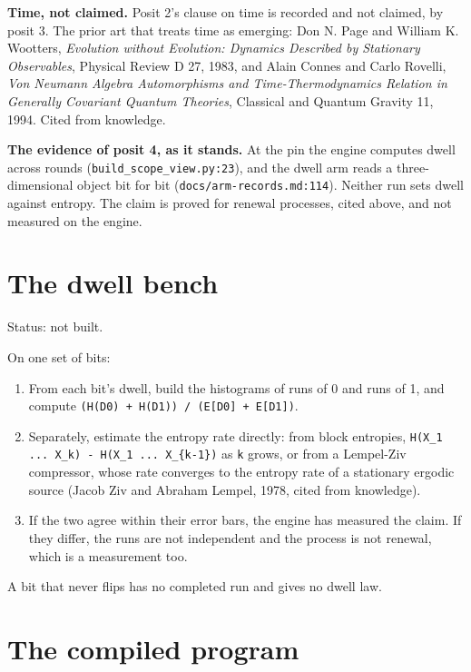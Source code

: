 \textbf{Time, not claimed.} Posit 2's clause on time is recorded and not claimed, by posit 3. The prior art that treats time as emerging: Don N. Page and William K. Wootters, \emph{Evolution without Evolution: Dynamics Described by Stationary Observables}, Physical Review D 27, 1983, and Alain Connes and Carlo Rovelli, \emph{Von Neumann Algebra Automorphisms and Time-Thermodynamics Relation in Generally Covariant Quantum Theories}, Classical and Quantum Gravity 11, 1994. Cited from knowledge.

\textbf{The evidence of posit 4, as it stands.} At the pin the engine computes dwell across rounds (\texttt{build\_\allowbreak{}scope\_\allowbreak{}view.\allowbreak{}py:23}), and the dwell arm reads a three-dimensional object bit for bit (\texttt{docs/\allowbreak{}arm-\allowbreak{}records.\allowbreak{}md:114}). Neither run sets dwell against entropy. The claim is proved for renewal processes, cited above, and not measured on the engine.

\section{\texorpdfstring{The dwell bench}{The dwell bench}}

Status: not built.

On one set of bits:

\begin{enumerate}
\item From each bit's dwell, build the histograms of runs of 0 and runs of 1, and compute \texttt{(H(D0) + H(D1)) /\allowbreak{} (E[D0] + E[D1])}.
\item Separately, estimate the entropy rate directly: from block entropies, \texttt{H(X\_\allowbreak{}1 .\allowbreak{}.\allowbreak{}.\allowbreak{} X\_\allowbreak{}k) -\allowbreak{} H(X\_\allowbreak{}1 .\allowbreak{}.\allowbreak{}.\allowbreak{} X\_\allowbreak{}\{k-\allowbreak{}1\})} as \texttt{k} grows, or from a Lempel-Ziv compressor, whose rate converges to the entropy rate of a stationary ergodic source (Jacob Ziv and Abraham Lempel, 1978, cited from knowledge).
\item If the two agree within their error bars, the engine has measured the claim. If they differ, the runs are not independent and the process is not renewal, which is a measurement too.
\end{enumerate}

A bit that never flips has no completed run and gives no dwell law.

\section{\texorpdfstring{The compiled program}{The compiled program}}

